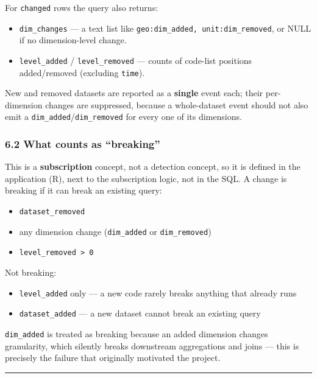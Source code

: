 \documentclass[
]{article}
\providecommand{\tightlist}{%
  \setlength{\itemsep}{0pt}\setlength{\parskip}{0pt}}
\begin{document}
For \texttt{changed} rows the query also returns:

\begin{itemize}
\tightlist
\item
  \texttt{dim\_changes} --- a text list like
  \texttt{geo:dim\_added,\ unit:dim\_removed}, or NULL if no
  dimension-level change.
\item
  \texttt{level\_added} / \texttt{level\_removed} --- counts of
  code-list positions added/removed (excluding \texttt{time}).
\end{itemize}

New and removed datasets are reported as a \textbf{single} event each;
their per-dimension changes are suppressed, because a whole-dataset
event should not also emit a \texttt{dim\_added}/\texttt{dim\_removed}
for every one of its dimensions.

\subsubsection{6.2 What counts as
``breaking''}\label{what-counts-as-breaking}

This is a \textbf{subscription} concept, not a detection concept, so it
is defined in the application (R), next to the subscription logic, not
in the SQL. A change is breaking if it can break an existing query:

\begin{itemize}
\tightlist
\item
  \texttt{dataset\_removed}
\item
  any dimension change (\texttt{dim\_added} or \texttt{dim\_removed})
\item
  \texttt{level\_removed\ \textgreater{}\ 0}
\end{itemize}

Not breaking:

\begin{itemize}
\tightlist
\item
  \texttt{level\_added} only --- a new code rarely breaks anything that
  already runs
\item
  \texttt{dataset\_added} --- a new dataset cannot break an existing
  query
\end{itemize}

\texttt{dim\_added} is treated as breaking because an added dimension
changes granularity, which silently breaks downstream aggregations and
joins --- this is precisely the failure that originally motivated the
project.

\begin{center}\rule{0.5\linewidth}{0.5pt}\end{center}
\end{document}
